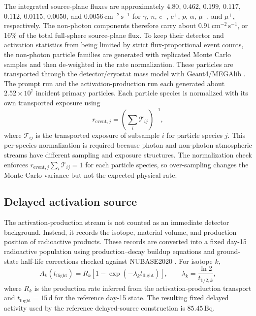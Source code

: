 \documentclass[preprint,12pt]{elsarticle}
\begin{document}
The integrated source-plane fluxes are approximately $4.80$, $0.462$, $0.199$, $0.117$, $0.112$, $0.0115$, $0.0050$, and $0.0056\,\mathrm{cm^{-2}\,s^{-1}}$ for $\gamma$, $n$, $e^-$, $e^+$, $p$, $\alpha$, $\mu^-$, and $\mu^+$, respectively. The non-photon components therefore carry about $0.91\,\mathrm{cm^{-2}\,s^{-1}}$, or 16\% of the total full-sphere source-plane flux. To keep their detector and activation statistics from being limited by strict flux-proportional event counts, the non-photon particle families are generated with replicated Monte Carlo samples and then de-weighted in the rate normalization. These particles are transported through the detector/cryostat mass model with Geant4/MEGAlib \cite{Agostinelli2003,Zoglauer2006}. The prompt run and the activation-production run each generated about $2.52\times10^7$ incident primary particles. Each particle species is normalized with its own transported exposure using
\begin{equation}
  r_{\mathrm{event},j}=\left(\sum_i \mathcal{T}_{ij}\right)^{-1},
\end{equation}
where $\mathcal{T}_{ij}$ is the transported exposure of subsample $i$ for particle species $j$. This per-species normalization is required because photon and non-photon atmospheric streams have different sampling and exposure structures. The normalization check enforces $r_{\mathrm{event},j}\sum_i\mathcal{T}_{ij}=1$ for each particle species, so over-sampling changes the Monte Carlo variance but not the expected physical rate.

\subsection{Delayed activation source}
\label{subsec:delayed_source}

The activation-production stream is not counted as an immediate detector background. Instead, it records the isotope, material volume, and production position of radioactive products. These records are converted into a fixed day-15 radioactive population using production--decay buildup equations and ground-state half-life corrections checked against NUBASE2020 \cite{Kondev2021NUBASE}. For isotope $k$,
\begin{equation}
  A_k(t_{\mathrm{flight}}) = R_k\left[1-\exp\left(-\lambda_k t_{\mathrm{flight}}\right)\right],
  \qquad \lambda_k = \frac{\ln 2}{t_{1/2,k}},
\end{equation}
where $R_k$ is the production rate inferred from the activation-production transport and $t_{\mathrm{flight}}=15\,\mathrm{d}$ for the reference day-15 state. The resulting fixed delayed activity used by the reference delayed-source construction is $85.45\,\mathrm{Bq}$.
\end{document}
